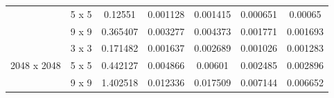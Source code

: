 \documentclass[10pt]{article}
\begin{document}
\begin{table}[H]
\begin{tabular}{ccccccc}
                             & 5 x 5                & 0.12551              & 0.001128            & 0.001415                    & 0.000651                      & 0.00065                      \\
                             & 9 x 9                & 0.365407             & 0.003277            & 0.004373                    & 0.001771                      & 0.001693                     \\ \hline
\multirow{3}{*}{2048 x 2048} & 3 x 3                & 0.171482             & 0.001637            & 0.002689                    & 0.001026                      & 0.001283                     \\
                             & 5 x 5                & 0.442127             & 0.004866            & 0.00601                     & 0.002485                      & 0.002896                     \\
                             & 9 x 9                & 1.402518             & 0.012336            & 0.017509                    & 0.007144                      & 0.006652                    
\end{tabular}
\end{table}
\end{document}
